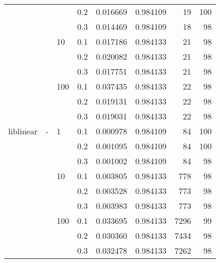 \begin{table}[H]
\begin{tabular}{llllrrrr}
          &   &     & 0.2 &  0.016669 &  0.984109 &      19 &   100 \\
          &   &     & 0.3 &  0.014469 &  0.984109 &      18 &    98 \\
          &   & 10  & 0.1 &  0.017186 &  0.984133 &      21 &    98 \\
          &   &     & 0.2 &  0.020082 &  0.984133 &      21 &    98 \\
          &   &     & 0.3 &  0.017751 &  0.984133 &      21 &    98 \\
          &   & 100 & 0.1 &  0.037435 &  0.984133 &      22 &    98 \\
          &   &     & 0.2 &  0.019131 &  0.984133 &      22 &    98 \\
          &   &     & 0.3 &  0.019031 &  0.984133 &      22 &    98 \\
liblinear & - & 1   & 0.1 &  0.000978 &  0.984109 &      84 &   100 \\
          &   &     & 0.2 &  0.001095 &  0.984109 &      84 &   100 \\
          &   &     & 0.3 &  0.001002 &  0.984109 &      84 &    98 \\
          &   & 10  & 0.1 &  0.003805 &  0.984133 &     778 &    98 \\
          &   &     & 0.2 &  0.003528 &  0.984133 &     773 &    98 \\
          &   &     & 0.3 &  0.003983 &  0.984133 &     773 &    98 \\
          &   & 100 & 0.1 &  0.033695 &  0.984133 &    7296 &    99 \\
          &   &     & 0.2 &  0.030360 &  0.984133 &    7434 &    98 \\
          &   &     & 0.3 &  0.032478 &  0.984133 &    7262 &    98 \\
\bottomrule
\end{tabular}
\end{table}
